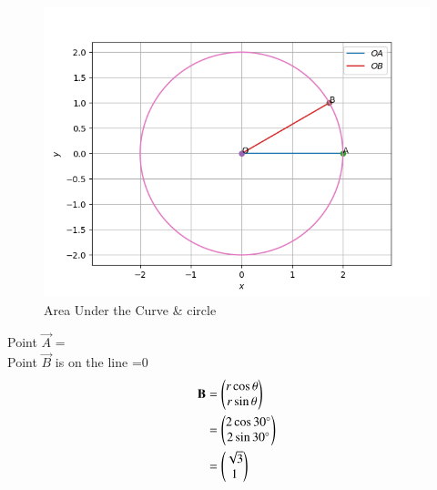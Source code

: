 \documentclass[journal,12pt,twocolumn]{IEEEtran}
\begin{document}
\begin{figure}[H]
\centering
\includegraphics[width=\columnwidth]{circle.png}
\caption{Area Under the Curve & circle  }
\label{fig:1}
\end{figure}
Point $\vec{A}$ =  \\
Point $\vec{B}$ is on the line =0
\begin{align}
    \mathbf{B} &=\begin{pmatrix}r \cos{\theta}  \\  r \sin{\theta}  \end{pmatrix} \\ 
    &= \begin{pmatrix}2 \cos{30 \degree} \\ 2 \sin{30 \degree}\end{pmatrix} \\
    &= \begin{pmatrix}\sqrt{3} \\ 1\end{pmatrix}
\end{align}
\end{document}
